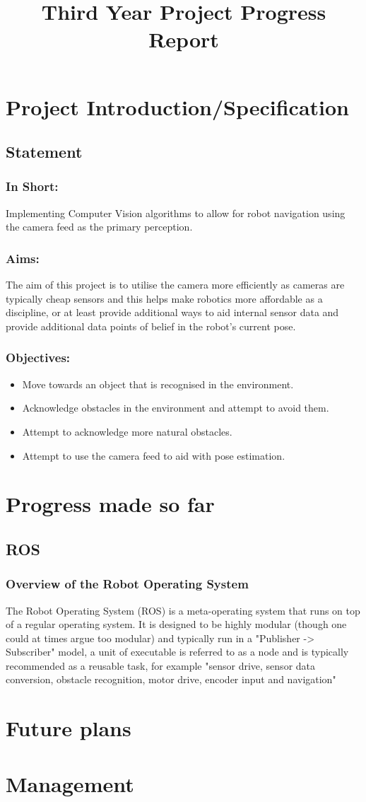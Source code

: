 \documentclass[10pt,a4paper]{report}
\title{Third Year Project Progress Report}
\begin{document}
\maketitle
\section*{Project Introduction/Specification}
	\subsection*{Statement}
		\subsubsection*{In Short:}
			Implementing Computer Vision algorithms to allow for robot navigation using the camera feed as the primary perception.
		\subsubsection*{Aims:}
			The aim of this project is to utilise the camera more efficiently as cameras are typically cheap sensors and this helps make robotics more affordable as a discipline, or at least provide additional ways to aid internal sensor data and provide additional data points of belief in the robot's current pose.
		\subsubsection*{Objectives:}
			\begin{itemize}
				\item Move towards an object that is recognised in the environment. 
				\item Acknowledge obstacles in the environment and attempt to avoid them.
				\item Attempt to acknowledge more natural obstacles.
				\item Attempt to use the camera feed to aid with pose estimation.
			\end{itemize}
\section*{Progress made so far}
	\subsection*{ROS}
		\subsubsection*{Overview of the Robot Operating System}
			The Robot Operating System (ROS) is a meta-operating system that runs on top of a regular operating system. It is designed to be highly modular (though one could at times argue too modular) and typically run in a "Publisher -> Subscriber" model, a unit of executable is referred to as a node and is typically recommended as a reusable task, for example "sensor drive, sensor data conversion, obstacle recognition, motor drive, encoder input and navigation"\cite{pyo_ros_en_2017}
\section*{Future plans}

\section*{Management}



\end{document}
